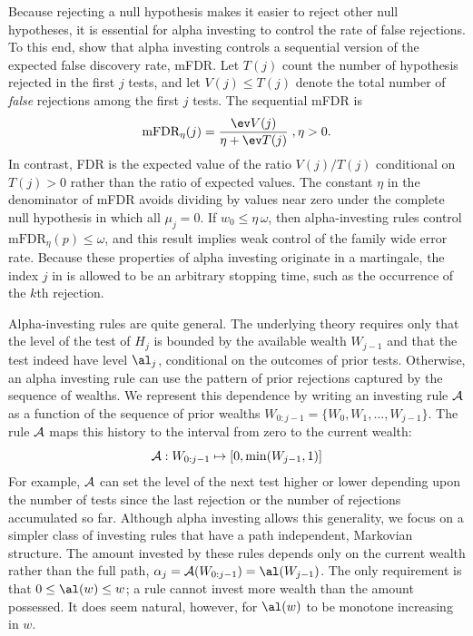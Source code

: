 \documentclass[12pt]{article}
\begin{document}
 Because rejecting a null hypothesis makes it easier to reject other null
 hypotheses, it is essential for alpha investing to control the rate of false
 rejections.  To this end, \citet{fosterstine08} show that alpha investing
 controls a sequential version of the expected false discovery rate, mFDR.  Let
 $T(j)$ count the number of hypothesis rejected in the first $j$ tests, and let
 $V(j) \le T(j)$ denote the total number of {\em false} rejections among the
 first $j$ tests.  The sequential mFDR is
 \begin{equation}
    \mbox{mFDR}_\eta(j) = \frac{\ev V(j)}{\eta + \ev T(j)} \;, \eta > 0.
 \label{eq:mFDR}
 \end{equation}
 In contrast, FDR is the expected value of the ratio $V(j)/T(j)$ conditional on
 $T(j)>0$ rather than the ratio of expected values.  The constant $\eta$ in the
 denominator of mFDR avoids dividing by values near zero under the complete null
 hypothesis in which all $\mu_j = 0$.  If $w_0 \le \eta\,\omega$, then
 alpha-investing rules control $\mbox{mFDR}_\eta(p) \le \omega$, and this result
 implies weak control of the family wide error rate.  Because these properties
 of alpha investing originate in a martingale, the index $j$ in  is
 allowed to be an arbitrary stopping time, such as the occurrence of the $k$th
 rejection.

 
 Alpha-investing rules are quite general.  The underlying theory requires only
 that the level of the test of $H_j$ is bounded by the available wealth
 $W_{j-1}$ and that the test indeed have level $\al_j$, conditional on the
 outcomes of prior tests.  Otherwise, an alpha investing rule can use the
 pattern of prior rejections captured by the sequence of wealths.  We represent
 this dependence by writing an investing rule ${\cal A}$ as a function of the
 sequence of prior wealths $W_{0:j-1} = \{W_0, W_1, \ldots, W_{j-1}\}$.  The rule
 $\cal A$ maps this history to the interval from zero to the current wealth:
 \begin{equation}
    {\cal A}: W_{0:j-1} \mapsto [0, \min(W_{j-1},1)]    
 \label{eq:A}
 \end{equation}
 For example, $\cal A$ can set the level of the next test higher or lower
 depending upon the number of tests since the last rejection or the number of
 rejections accumulated so far.  Although alpha investing allows this
 generality, we focus on a simpler class of investing rules that have a path
 independent, Markovian structure.  The amount invested by these rules depends
 only on the current wealth rather than the full path, $\alpha_j = {\cal
 A}(W_{0:j-1}) = \al(W_{j-1})$.  The only requirement is that $0 \le \al(w) \le w$; a
 rule cannot invest more wealth than the amount possessed.  It does seem
 natural, however, for $\al(w)$ to be monotone increasing in $w$.
\end{document}
